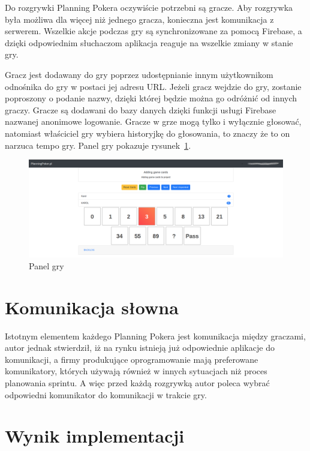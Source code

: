 Do rozgrywki Planning Pokera oczywiście potrzebni są gracze.
Aby rozgrywka była możliwa dla więcej niż jednego gracza, konieczna jest komunikacja z serwerem.
Wszelkie akcje podczas gry są synchronizowane za pomocą Firebase,
a dzięki odpowiednim słuchaczom aplikacja reaguje na wszelkie zmiany w stanie gry.

Gracz jest dodawany do gry poprzez udostępnianie innym użytkownikom odnośnika do gry
w postaci jej adresu URL.
Jeżeli gracz wejdzie do gry, zostanie poproszony o podanie nazwy,
dzięki której będzie można go odróżnić od innych graczy.
Gracze są dodawani do bazy danych dzięki funkcji usługi Firebase nazwanej anonimowe logowanie.
Gracze w grze mogą tylko i wyłącznie głosować,
natomiast właściciel gry wybiera historyjkę do głosowania, to znaczy że to on narzuca tempo gry.
Panel gry pokazuje rysunek~\ref{rys:gra}.

\begin{figure}[h]
	\centering\includegraphics[width=\textwidth]{img/gra}
	\caption{Panel gry}\label{rys:gra}%
\end{figure}

\section{Komunikacja słowna}

Istotnym elementem każdego Planning Pokera jest komunikacja między graczami,
autor jednak stwierdził,
iż na rynku istnieją już odpowiednie aplikacje do komunikacji,
a firmy produkujące oprogramowanie mają preferowane komunikatory, których używają
również w innych sytuacjach niż proces planowania sprintu.
A więc przed każdą rozgrywką autor poleca wybrać odpowiedni komunikator do komunikacji w trakcie gry.


\section{Wynik implementacji}

